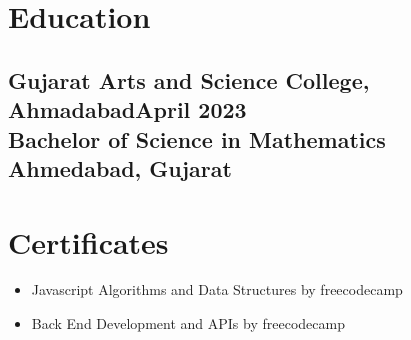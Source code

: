 \documentclass[a4paper]{article}
\newcommand{\experiencetitle}[4]{\subsection{\texorpdfstring{#1\hfill \small \textmd{#4} \\
	\textmd{#3} \hfill \textmd{#2}}{#1}}}
\begin{document}




\section{Education}
\experiencetitle
{Gujarat Arts and Science College, Ahmadabad}{Ahmedabad, Gujarat}
{Bachelor of Science in Mathematics}{April 2023}

\section{Certificates}
\begin{itemize}
	\item Javascript Algorithms and Data Structures by freecodecamp
	\item Back End Development and APIs by freecodecamp
\end{itemize}
\end{document}
